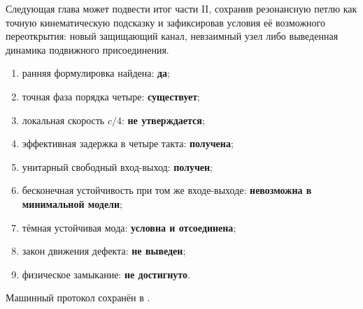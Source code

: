 Следующая глава может подвести итог части II, сохранив резонансную петлю
как точную кинематическую подсказку и зафиксировав условия её возможного
переоткрытия: новый защищающий канал, невзаимный узел либо выведенная
динамика подвижного присоединения.

\begin{protocol}
\begin{enumerate}
 \item ранняя формулировка найдена: \textbf{да};
 \item точная фаза порядка четыре: \textbf{существует};
 \item локальная скорость $c/4$: \textbf{не утверждается};
 \item эффективная задержка в четыре такта: \textbf{получена};
 \item унитарный свободный вход-выход: \textbf{получен};
 \item бесконечная устойчивость при том же входе-выходе:
 \textbf{невозможна в минимальной модели};
 \item тёмная устойчивая мода: \textbf{условна и отсоединена};
 \item закон движения дефекта: \textbf{не выведен};
 \item физическое замыкание: \textbf{не достигнуто}.
\end{enumerate}
\end{protocol}

Машинный протокол сохранён в
.